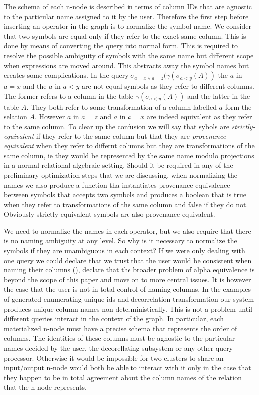 The schema of each n-node is described in terms of column IDs that are
agnostic to the particular name assigned to it by the user. Therefore
the first step before inserting an operator in the graph is to
normalize the symbol name. We consider that two symbols are equal only
if they refer to the exact same column. This is done by means of
converting the query into normal form. This is required to resolve the
possible ambiguity of symbols with the same name but different scope
when expressions are moved around. This abstracts away the symbol
names but creates some complications. In the query
\(\sigma_{a=x \lor a=z}(\gamma(\sigma_{a<y}(A))\) the \(a\) in \(a=x\)
and the \(a\) in \(a < y\) are not equal symbols as they refer to
different columns. The former refers to a column in the table
\(\gamma(\sigma_{a<y}(A))\) and the latter in the table \(A\). They
both refer to some transformation of a column labelled \(a\) form the
selation \(A\). However \(a\) in \(a=z\) and \(a\) in \(a=x\) are
indeed equivalent as they refer to the same column. To clear up the
confusion we will say that sybols are \emph{strictly-equivalent} if
they refer to the same column but that they are
\emph{provenance-equivalent} when they refer to differnt columns but
they are transformations of the same column, ie they would be
represented by the same name modulo projections in a normal relational
algebraic setting. Should it be required in any of the preliminary
optimization steps that we are discussing, when normalizing the names
we also produce a function tha instantiates provenance equivalence
between symbols that accepts two symbols and produces a boolean that
is true when they refer to transformations of the same column and
false if they do not. Obviously strictly equivalent symbols are also
provenance equivalent.

We need to normalize the names in each operator, but we also require
that there is no naming ambiguity at any level. So why is it necessary
to normalize the symbols if they are unambiguous in each context? If
we were only dealing with one query we could declare that we trust
that the user would be consistent when naming their columns
(), declare that the broader problem
of alpha equivalence is beyond the scope of this paper and move on to
more central issues. It is however the case that the user is not in
total control of naming columns. In the examples of generated
enumerating unique ids and decorrelation transformation our system
produces unique column names non-deterministically. This is not a
problem until different queries interact in the context of the
graph. In particular, each materialized n-node must have a precise
schema that represents the order of columns. The identities of these
columns must be agnostic to the particular names decided by the user,
the decorellating subsystem or any other query processor. Otherwise it
would be impossible for two clusters to share an input/output n-node
would both be able to interact with it only in the case that they
happen to be in total agreement about the column names of the relation
that the n-node represents.

